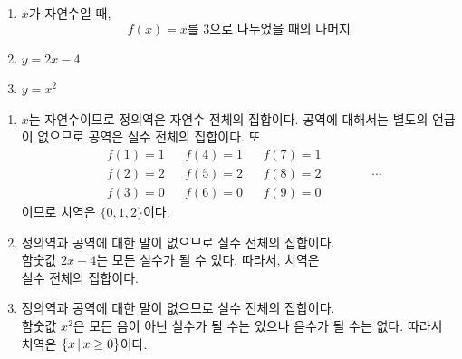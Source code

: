 \documentclass{oblivoir}
\begin{document}
\vspace{-15pt}
%
\begin{enumerate}[itemsep=0pt]\label{function6}
\item
\(x\)가 자연수일 때,\\
\vspace{-15pt}
\[f(x)=x\text{를 3으로 나누었을 때의 나머지}\]
\item
\(y=2x-4\)%
\item
\(y=x^2\)
\end{enumerate}
\begin{mdframed}
\begin{enumerate}
\item
\(x\)는 자연수이므로 정의역은 자연수 전체의 집합이다.
공역에 대해서는 별도의 언급이 없으므로 공역은 실수 전체의 집합이다.
또
\begin{align*}
&f(1)=1&&f(4)=1&&f(7)=1\\
&f(2)=2&&f(5)=2&&f(8)=2\qquad\qquad\cdots\\
&f(3)=0&&f(6)=0&&f(9)=0
\end{align*}
이므로 치역은 \(\{0,1,2\}\)이다.
\item
정의역과 공역에 대한 말이 없으므로 실수 전체의 집합이다.\\
함숫값 \(2x-4\)는 모든 실수가 될 수 있다.
따라서, 치역은\\ 실수 전체의 집합이다.
\item
정의역과 공역에 대한 말이 없으므로 실수 전체의 집합이다.\\
함숫값 \(x^2\)은 모든 음이 아닌 실수가 될 수는 있으나 음수가 될 수는 없다.
따라서 치역은 \(\{x\,|\, x\ge0\}\)이다.
\end{enumerate}
\end{mdframed}
\end{document}
